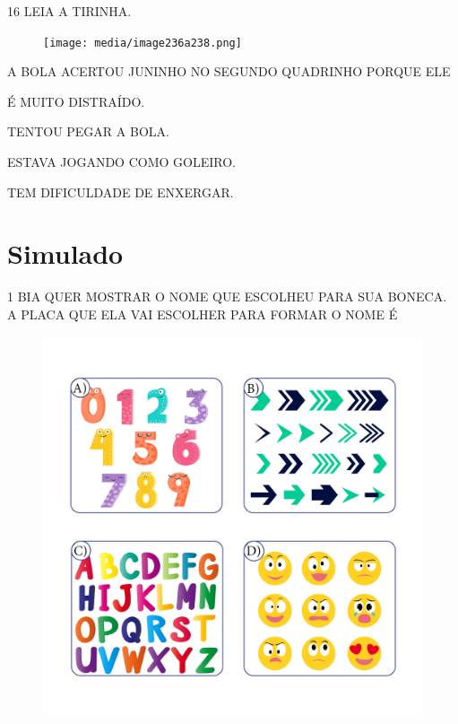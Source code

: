 \pagebreak

\num{16} LEIA A TIRINHA.

\begin{figure}[H]
\texttt{[image: media/image236a238.png]}
\end{figure}


A BOLA ACERTOU JUNINHO NO SEGUNDO QUADRINHO PORQUE ELE

\begin{escolha}
\item É MUITO DISTRAÍDO.

\item TENTOU PEGAR A BOLA. 

\item ESTAVA JOGANDO COMO GOLEIRO.

\item TEM DIFICULDADE DE ENXERGAR.
\end{escolha}

\chapter[Simulado 4]{Simulado}

\pagebreak

\num{1} BIA QUER MOSTRAR O NOME QUE ESCOLHEU PARA SUA BONECA.
A PLACA QUE ELA VAI ESCOLHER PARA FORMAR O NOME É

\begin{figure}[H]
\includegraphics[width=\textwidth]{media/image239a242.png}
\end{figure}

